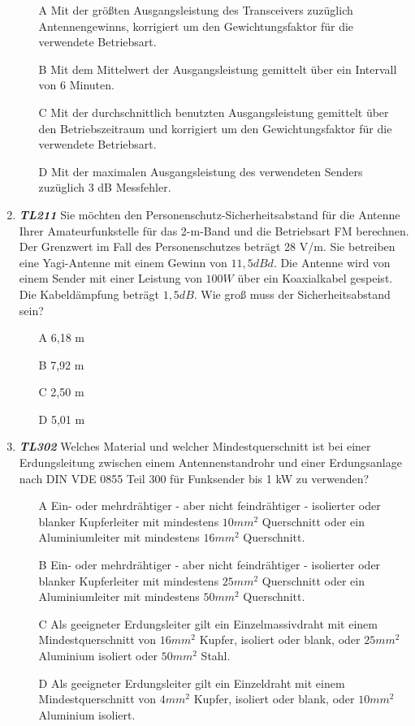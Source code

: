 \begin{enumerate}
\begin{enumerate}
	\itemsep1pt\parskip0pt
		\item[A] Mit der größten Ausgangsleistung des Transceivers zuzüglich Antennengewinns, korrigiert um den Gewichtungsfaktor für die verwendete Betriebsart.
		\item[B] Mit dem Mittelwert der Ausgangsleistung gemittelt über ein Intervall von 6 Minuten.
		\item[C]  Mit der durchschnittlich benutzten Ausgangsleistung gemittelt über den Betriebszeitraum und korrigiert um den Gewichtungsfaktor für die verwendete Betriebsart.
		\item[D]  Mit der maximalen Ausgangsleistung des verwendeten Senders zuzüglich 3 dB Messfehler.
		\end{enumerate}	
	\item \emph{\textbf{TL211}} Sie möchten den Personenschutz-Sicherheitsabstand für die Antenne Ihrer Amateurfunkstelle für das 2-m-Band und die Betriebsart FM berechnen. Der Grenzwert im Fall des Personenschutzes beträgt 28 V/m. Sie betreiben eine Yagi-Antenne mit einem Gewinn von $11,5 dBd$. Die Antenne wird von einem Sender mit einer Leistung von $100 W$ über ein Koaxialkabel gespeist. Die Kabeldämpfung beträgt $1,5 dB$. Wie groß muss der Sicherheitsabstand sein?
	\begin{enumerate}
	\itemsep1pt\parskip0pt
		\item[A] 6,18 m
		\item[B] 7,92 m
		\item[C] 2,50 m
		\item[D] 5,01 m
		\end{enumerate}
	\item \emph{\textbf{TL302}} Welches Material und welcher Mindestquerschnitt ist bei einer Erdungsleitung zwischen einem Antennenstandrohr und einer Erdungsanlage nach DIN VDE 0855 Teil 300 für Funksender bis 1 kW zu verwenden?
	\begin{enumerate}
	\itemsep1pt\parskip0pt
		\item[A] Ein- oder mehrdrähtiger - aber nicht feindrähtiger - isolierter oder blanker Kupferleiter mit mindestens $10 mm^2$ Querschnitt oder ein Aluminiumleiter mit mindestens $16 mm^2$ Querschnitt.
		\item[B] Ein- oder mehrdrähtiger - aber nicht feindrähtiger - isolierter oder blanker Kupferleiter mit mindestens $25 mm^2$ Querschnitt oder ein Aluminiumleiter mit mindestens $50 mm^2$ Querschnitt.
		\item[C]  Als geeigneter Erdungsleiter gilt ein Einzelmassivdraht mit einem Mindestquerschnitt von $16 mm^2$ Kupfer, isoliert oder blank, oder $25 mm^2$ Aluminium isoliert oder $50 mm^2$ Stahl.
		\item[D] Als geeigneter Erdungsleiter gilt ein Einzeldraht mit einem Mindestquerschnitt von $4 mm^2$ Kupfer, isoliert oder blank, oder $10 mm^2$ Aluminium isoliert.
		\end{enumerate}
\end{enumerate}



